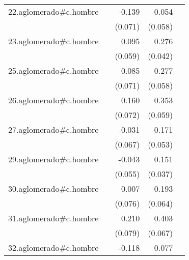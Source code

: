 {\begin{longtable}{l*{4}{D{.}{.}{-1}}}
\addlinespace
22.aglomerado#c.hombre&                     &      -0.139         &       0.054         &                     \\
            &                     &     (0.071)         &     (0.058)         &                     \\
\addlinespace
23.aglomerado#c.hombre&                     &       0.095         &       0.276\sym{***}&                     \\
            &                     &     (0.059)         &     (0.042)         &                     \\
\addlinespace
25.aglomerado#c.hombre&                     &       0.085         &       0.277\sym{***}&                     \\
            &                     &     (0.071)         &     (0.058)         &                     \\
\addlinespace
26.aglomerado#c.hombre&                     &       0.160\sym{*}  &       0.353\sym{***}&                     \\
            &                     &     (0.072)         &     (0.059)         &                     \\
\addlinespace
27.aglomerado#c.hombre&                     &      -0.031         &       0.171\sym{**} &                     \\
            &                     &     (0.067)         &     (0.053)         &                     \\
\addlinespace
29.aglomerado#c.hombre&                     &      -0.043         &       0.151\sym{***}&                     \\
            &                     &     (0.055)         &     (0.037)         &                     \\
\addlinespace
30.aglomerado#c.hombre&                     &       0.007         &       0.193\sym{**} &                     \\
            &                     &     (0.076)         &     (0.064)         &                     \\
\addlinespace
31.aglomerado#c.hombre&                     &       0.210\sym{**} &       0.403\sym{***}&                     \\
            &                     &     (0.079)         &     (0.067)         &                     \\
\addlinespace
32.aglomerado#c.hombre&                     &      -0.118\sym{*}  &       0.077\sym{*}  &                     \\

\end{longtable}}
